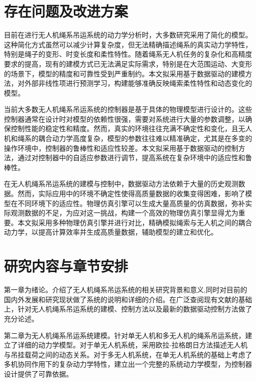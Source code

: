 \documentclass[lang=chs, degree=master, blindreview=true, winfonts=true]{yanputhesis}
\begin{document}
\section{存在问题及改进方案}
目前在进行无人机绳系吊运系统的动力学分析时，大多数研究采用了简化的模型。这种简化方式虽然可以减少计算复杂度，但无法精确描述绳系的真实动力学特性，特别是绳子的变形、时变长度和柔性特性。随着绳系无人机任务的复杂化和高精度要求的提高，现有的建模方式已无法满足实际需求，特别是在大范围运动、大变形的场景下，模型的精度和可靠性受到严重制约。本文拟采用基于数据驱动的建模方法，对外部非线性项进行预测学习，构建能够准确反映绳索柔性特性和动态变化的模型。

当前大多数无人机绳系吊运系统的控制器是基于具体的物理模型进行设计的。这些控制器通常在设计时对模型的依赖性很强，需要对系统进行大量的参数调整，以确保控制性能的稳定性和精度。然而，真实的环境往往充满不确定性和变化，且无人机和绳系的耦合动力学高度复杂，模型的参数往往难以精准确定，尤其是在多变的操作环境中，控制器的鲁棒性和适应性较差。本文拟采用基于数据驱动的控制方法，通过对控制器中的自适应参数进行调节，提高系统在复杂环境中的适应性和鲁棒性。

在无人机绳系吊运系统的建模与控制中，数据驱动方法依赖于大量的历史观测数据。然而，实际应用中的环境不确定性使得高质量数据的收集变得困难，影响了模型在不同环境下的适应性。物理仿真引擎可以生成大量高质量的仿真数据，弥补实际观测数据的不足，为应对这一挑战，构建一个高效的物理仿真引擎显得尤为重要。本文拟采用多种物理仿真引擎并进行对比，精确模拟绳索与无人机之间的耦合动力学，以提高计算效率并生成高质量数据，辅助模型的建立和优化。

\section{研究内容与章节安排}

第一章为绪论。介绍了无人机绳系吊运系统的相关研究背景和意义,同时对目前的国内外发展和研究现状做了系统的说明和详细的介绍。在广泛查阅现有文献的基础上，针对无人机绳系吊运系统的建模、控制方法以及最新的数据驱动控制方法做了充分论述。

第二章为无人机绳系吊运系统建模。针对单无人机和多无人机的绳系吊运系统，建立了详细的动力学模型。对于单无人机系统，采用欧拉-拉格朗日方法描述无人机与吊挂载荷之间的动态关系。对于多无人机系统，在单无人机系统的基础上考虑了多机协同作用下的复杂动力学特性，建立出一个完整的系统动力学模型，为控制器设计提供了可靠依据。 
\end{document}
